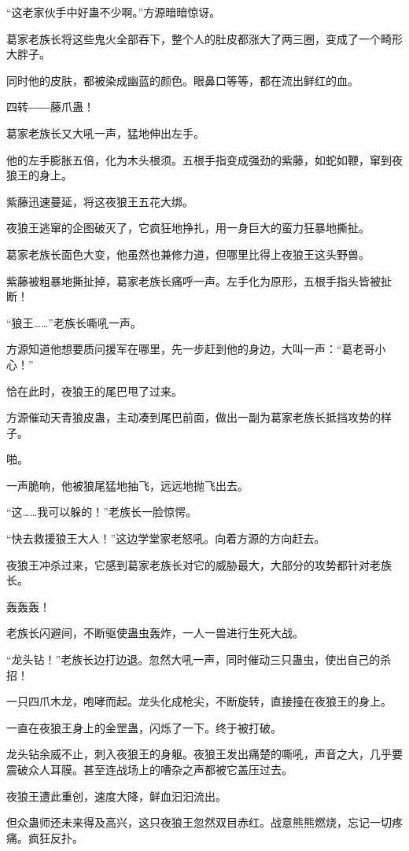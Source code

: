 \begin{this_body}
“这老家伙手中好蛊不少啊。”方源暗暗惊讶。

葛家老族长将这些鬼火全部吞下，整个人的肚皮都涨大了两三圈，变成了一个畸形大胖子。

同时他的皮肤，都被染成幽蓝的颜色。眼鼻口等等，都在流出鲜红的血。

四转――藤爪蛊！

葛家老族长又大吼一声，猛地伸出左手。

他的左手膨胀五倍，化为木头根须。五根手指变成强劲的紫藤，如蛇如鞭，窜到夜狼王的身上。

紫藤迅速蔓延，将这夜狼王五花大绑。

夜狼王逃窜的企图破灭了，它疯狂地挣扎，用一身巨大的蛮力狂暴地撕扯。

葛家老族长面色大变，他虽然也兼修力道，但哪里比得上夜狼王这头野兽。

紫藤被粗暴地撕扯掉，葛家老族长痛呼一声。左手化为原形，五根手指头皆被扯断！

“狼王……”老族长嘶吼一声。

方源知道他想要质问援军在哪里，先一步赶到他的身边，大叫一声：“葛老哥小心！”

恰在此时，夜狼王的尾巴甩了过来。

方源催动天青狼皮蛊，主动凑到尾巴前面，做出一副为葛家老族长抵挡攻势的样子。

啪。

一声脆响，他被狼尾猛地抽飞，远远地抛飞出去。

“这……我可以躲的！”老族长一脸惊愕。

“快去救援狼王大人！”这边学堂家老怒吼。向着方源的方向赶去。

夜狼王冲杀过来，它感到葛家老族长对它的威胁最大，大部分的攻势都针对老族长。

轰轰轰！

老族长闪避间，不断驱使蛊虫轰炸，一人一兽进行生死大战。

“龙头钻！”老族长边打边退。忽然大吼一声，同时催动三只蛊虫，使出自己的杀招！

一只四爪木龙，咆哮而起。龙头化成枪尖，不断旋转，直接撞在夜狼王的身上。

一直在夜狼王身上的金罡蛊，闪烁了一下。终于被打破。

龙头钻余威不止，刺入夜狼王的身躯。夜狼王发出痛楚的嘶吼，声音之大，几乎要震破众人耳膜。甚至连战场上的嘈杂之声都被它盖压过去。

夜狼王遭此重创，速度大降，鲜血汩汩流出。

但众蛊师还未来得及高兴，这只夜狼王忽然双目赤红。战意熊熊燃烧，忘记一切疼痛。疯狂反扑。


\end{this_body}
